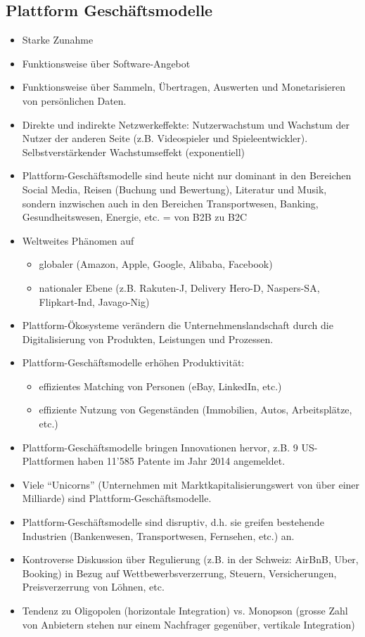 \subsection{Plattform Geschäftsmodelle}
\begin{itemize}
	\item Starke Zunahme
	\item Funktionsweise über Software-Angebot
	\item Funktionsweise über Sammeln, Übertragen, Auswerten und Monetarisieren von persönlichen Daten.
	\item Direkte und indirekte Netzwerkeffekte: Nutzerwachstum und Wachstum der Nutzer der anderen Seite (z.B. Videospieler und Spieleentwickler). Selbstverstärkender Wachstumseffekt (exponentiell)
	\item Plattform-Geschäftsmodelle sind heute nicht nur dominant in den Bereichen	Social Media, Reisen (Buchung und Bewertung), Literatur und Musik, sondern inzwischen auch in den Bereichen Transportwesen, Banking, Gesundheitswesen, Energie, etc. = von B2B zu B2C
	\item Weltweites Phänomen auf
	\begin{itemize}
		\item globaler (Amazon, Apple, Google, Alibaba, Facebook)
		\item nationaler Ebene (z.B. Rakuten-J, Delivery Hero-D, Naspers-SA, Flipkart-Ind, Javago-Nig)
	\end{itemize}
	\item Plattform-Ökosysteme verändern die Unternehmenslandschaft durch die Digitalisierung von Produkten, Leistungen und Prozessen.
	\item Plattform-Geschäftsmodelle erhöhen Produktivität:
	\begin{itemize}
		\item effizientes Matching von Personen (eBay, LinkedIn, etc.)
		\item effiziente Nutzung von Gegenständen (Immobilien, Autos, Arbeitsplätze, etc.)
	\end{itemize}
	\item Plattform-Geschäftsmodelle bringen Innovationen hervor, z.B. 9 US-Plattformen haben 11’585 Patente im Jahr 2014 angemeldet.
	\item Viele “Unicorns” (Unternehmen mit Marktkapitalisierungswert von über einer Milliarde) sind Plattform-Geschäftsmodelle.
	\item Plattform-Geschäftsmodelle sind disruptiv, d.h. sie greifen bestehende Industrien (Bankenwesen, Transportwesen, Fernsehen, etc.) an.
	\item Kontroverse Diskussion über Regulierung (z.B. in der Schweiz: AirBnB, Uber, Booking) in Bezug auf Wettbewerbsverzerrung, Steuern, Versicherungen, Preisverzerrung von Löhnen, etc.
	\item Tendenz zu Oligopolen (horizontale Integration) vs. Monopson (grosse Zahl von Anbietern stehen nur einem Nachfrager gegenüber, vertikale Integration)
\end{itemize}

